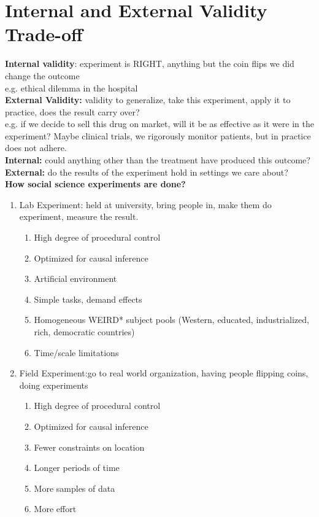 \section{Internal and External Validity Trade-off}
\textbf{Internal validity}: experiment is RIGHT, anything but the coin flips we did change the outcome\\
e.g. ethical dilemma in the hospital\\
\textbf{External Validity:} validity to generalize, take this experiment, apply it to practice, does the result carry over? \\
e.g. if we decide to sell this drug on market, will it be as effective as it were in the experiment? Maybe clinical trials, we rigorously monitor patients, but in practice does not adhere.\\
\textbf{Internal:} could anything other than the treatment have produced this outcome?\\
\textbf{External:} do the results of the experiment hold in settings we care about?
\\
\textbf{How social science experiments are done?}\\
\begin{enumerate}
  \item Lab Experiment: held at university, bring people in, make them do experiment, measure the result.
  	\begin{enumerate}
  	\item High degree of procedural control
  	\item Optimized for causal inference
  	\item Artificial environment
    \item Simple tasks, demand effects
    \item Homogeneous WEIRD* subject pools (Western, educated, industrialized, rich, democratic countries)
    \item Time/scale limitations
	\end{enumerate}
  \item Field Experiment:go to real world organization, having people flipping coins, doing experiments
  	\begin{enumerate}
  	\item High degree of procedural control
  	\item Optimized for causal inference
  	\item Fewer constraints on location
    \item Longer periods of time
    \item More samples of data
    \item More effort
    \end{enumerate}
\end{enumerate}

